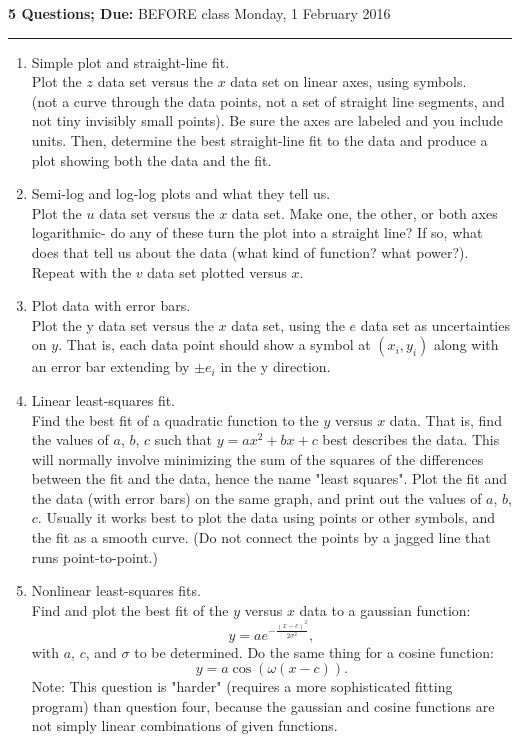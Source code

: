 \documentclass[aps,secnumarabic,balancelastpage,amsmath,amssymb,nofootinbib]{revtex4-1}
\begin{document}
\textbf{5 Questions; Due:} BEFORE class Monday, 1 February 2016\\
\rule{\columnwidth}{0.5pt}
\vspace*{-9mm}
\begin{enumerate}
\item \textsf{Simple plot and straight-line fit.} \\
Plot the $z$ data set versus the $x$ data set on linear axes, using symbols.\\
(not a curve through the data points, not a set of straight line segments, and not tiny invisibly small points). 
Be sure the axes are labeled and you include units.
Then, determine the best straight-line fit to the data and produce a plot showing both the data and the fit.

\item \textsf{Semi-log and log-log plots and what they tell us.}\\ Plot the $u$ data set versus the $x$ data set. 
Make one, the other, or both axes logarithmic- do any of these turn the plot into a straight line? 
If so, what does that tell us about the data (what kind of function? what power?). 
Repeat with the $v$ data set plotted versus $x$.

\item \textsf{Plot data with error bars.}\\
Plot the y data set versus the $x$ data set, using the $e$ data set as uncertainties on $y$. 
That is, each data point should show a symbol at $(x_i, y_i)$ along with an error bar extending by $\pm e_i$ in the y direction.

\item \textsf{Linear least-squares fit.}\\ Find the best fit of a quadratic function to the $y$ versus $x$ data. That is, find the values of $a$, $b$, $c$ 
such that $y = a x^2 + b x + c$ best describes the data. This will normally involve minimizing the sum of the squares of the differences 
between the fit and the data, hence the name "least squares". Plot the fit and the data (with error bars) on the same graph, 
and print out the values of $a$, $b$, $c$. Usually it works best to plot the data using points or other symbols, and the fit as a smooth curve.
(Do not connect the points by a jagged line that runs point-to-point.)
\pagebreak
\item \textsf{Nonlinear least-squares fits.}\\
 Find and plot the best fit of the $y$ versus $x$ data to a gaussian function: 
$$ y = a e^{-\frac{(x-c)^2}{2\sigma^2}}, $$
with $a$, $c$, and $\sigma$ to be determined. Do the same thing for a cosine function: 
$$ y = a \cos(\omega(x-c)).$$
Note: This question is "harder" (requires a more sophisticated fitting program) than question four, because the gaussian and cosine 
functions are not simply linear combinations of given functions.


\end{enumerate}
\end{document}
